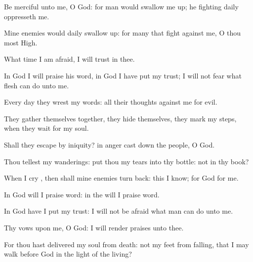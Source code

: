 {\Q {}Be
merciful unto me, O
God: for
man would swallow me
up; he
fighting
daily
oppresseth me.


\par }{\Q {}Mine
enemies would
daily
swallow
{} up: for
{}
many that
fight against me, O thou most
High.


\par }{\Q {}What
time I am
afraid, I will
trust in thee.


\par }{\Q {}In
God I will
praise his
word, in
God I have put my
trust; I will not
fear what
flesh can
do unto me.


\par }{\Q {}Every
day they
wrest my
words: all their
thoughts
{} against me for
evil.


\par }{\Q {}They gather themselves
together, they
hide themselves, they
mark my
steps, when they
wait for my
soul.


\par }{\Q {}Shall they
escape by
iniquity? in
{}
anger cast
down the
people, O
God.


\par }{\BB \par }
{\Q {}Thou
tellest my
wanderings:
put thou my
tears into thy
bottle:
{} not in thy
book?


\par }{\Q {}When I
cry
{}, then shall mine
enemies
turn
back: this I
know; for
God
{} for me.


\par }{\Q {}In
God will I
praise
{}
word: in the
{} will I
praise
{}
word.


\par }{\Q {}In
God have I put my
trust: I will not be
afraid what
man can
do unto me.


\par }{\Q {}Thy
vows
{} upon me, O
God: I will
render
praises unto thee.


\par }{\Q {}For thou hast
delivered my
soul from
death:
{} not
{} my
feet from
falling, that I may
walk
before
God in the
light of the
living?




\par }
